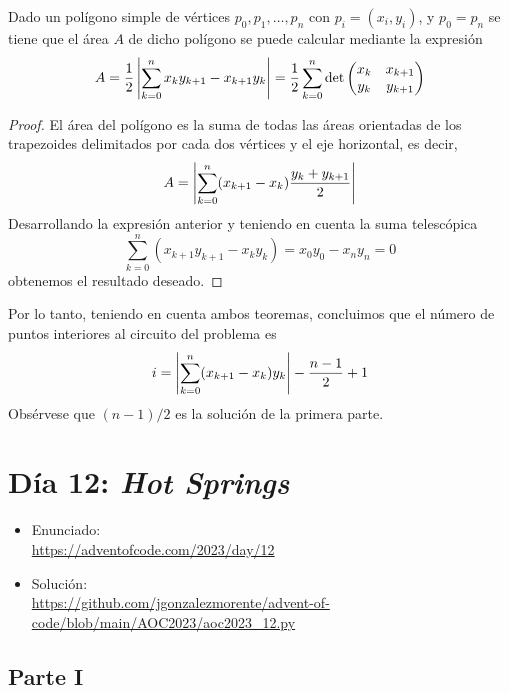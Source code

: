 \documentclass[a4paper,12pt]{article}
\begin{document}
\begin{teo}
    Dado un polígono simple de vértices $p_0, p_1,\dots, p_n$ con $p_i=(x_i,y_i)$, y $p_0=p_n$ se tiene que el área $A$ de dicho polígono se puede calcular mediante la expresión
    $$A=\frac{1}{2}\left| \sum_{k=0}^nx_ky_{k+1} - x_{k+1}y_k\right|=\frac{1}{2}\sum_{k=0}^n\det\begin{pmatrix}
        x_k & x_{k+1} \\
        y_k & y_{k+1}
    \end{pmatrix}$$    
\end{teo}

\begin{proof}
    El área del polígono es la suma de todas las áreas orientadas de los trapezoides delimitados por cada dos vértices y el eje horizontal, es decir,
    $$A=\left| \sum_{k=0}^n(x_{k+1}-x_k)\frac{y_k+y_{k+1}}{2}\right|$$
    Desarrollando la expresión anterior y teniendo en cuenta la suma telescópica
    $$\sum_{k=0}^n(x_{k+1}y_{k+1}-x_ky_k)=x_0y_0-x_ny_n=0$$
    obtenemos el resultado deseado.    
\end{proof}

Por lo tanto, teniendo en cuenta ambos teoremas, concluimos que el número de puntos interiores al circuito del problema es
$$i= \left| \sum_{k=0}^n(x_{k+1} - x_k)y_k\right|-\frac{n-1}{2}+1$$
Obsérvese que $(n-1)/2$ es la solución de la primera parte.

\section{Día 12: \textnormal{ \it Hot Springs}}
\begin{itemize}
    \item Enunciado: \\
    \href{https://adventofcode.com/2023/day/12}{https://adventofcode.com/2023/day/12}
    \item Solución: \\ 
    \href{https://github.com/jgonzalezmorente/advent-of-code/blob/main/AOC2023/aoc2023_12.py}{https://github.com/jgonzalezmorente/advent-of-code/blob/main/AOC2023/aoc2023\_12.py}
\end{itemize}

\subsection{Parte I}
\end{document}
